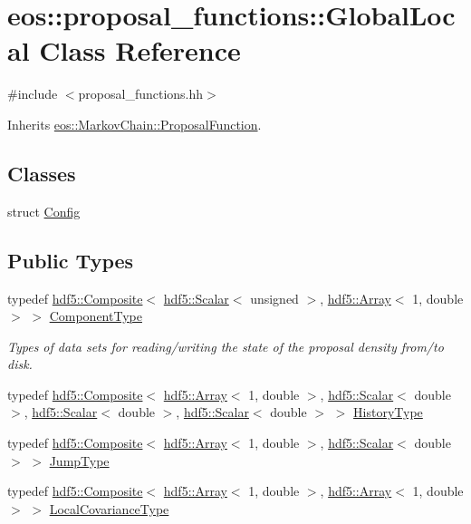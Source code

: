 \hypertarget{classeos_1_1proposal__functions_1_1GlobalLocal}{
\section{eos::proposal\_\-functions::GlobalLocal Class Reference}
\label{classeos_1_1proposal__functions_1_1GlobalLocal}
}


{\ttfamily \#include $<$proposal\_\-functions.hh$>$}

Inherits \hyperlink{structeos_1_1MarkovChain_1_1ProposalFunction}{eos::MarkovChain::ProposalFunction}.\subsection*{Classes}
\begin{DoxyCompactItemize}
\item 
struct \hyperlink{structeos_1_1proposal__functions_1_1GlobalLocal_1_1Config}{Config}
\end{DoxyCompactItemize}
\subsection*{Public Types}
\begin{DoxyCompactItemize}
\item 
typedef \hyperlink{classeos_1_1hdf5_1_1Composite}{hdf5::Composite}$<$ \hyperlink{classeos_1_1hdf5_1_1Scalar}{hdf5::Scalar}$<$ unsigned $>$, \hyperlink{classeos_1_1hdf5_1_1Array}{hdf5::Array}$<$ 1, double $>$ $>$ \hyperlink{classeos_1_1proposal__functions_1_1GlobalLocal_a8a0b2c1a71f2302bd4eeb95bc1d0041a}{ComponentType}
\begin{DoxyCompactList}\small\item\em Types of data sets for reading/writing the state of the proposal density from/to disk. \item\end{DoxyCompactList}\item 
typedef \hyperlink{classeos_1_1hdf5_1_1Composite}{hdf5::Composite}$<$ \hyperlink{classeos_1_1hdf5_1_1Array}{hdf5::Array}$<$ 1, double $>$, \hyperlink{classeos_1_1hdf5_1_1Scalar}{hdf5::Scalar}$<$ double $>$, \hyperlink{classeos_1_1hdf5_1_1Scalar}{hdf5::Scalar}$<$ double $>$, \hyperlink{classeos_1_1hdf5_1_1Scalar}{hdf5::Scalar}$<$ double $>$ $>$ \hyperlink{classeos_1_1proposal__functions_1_1GlobalLocal_ac6705377112dbaacb0141371b3c58b92}{HistoryType}
\item 
typedef \hyperlink{classeos_1_1hdf5_1_1Composite}{hdf5::Composite}$<$ \hyperlink{classeos_1_1hdf5_1_1Array}{hdf5::Array}$<$ 1, double $>$, \hyperlink{classeos_1_1hdf5_1_1Scalar}{hdf5::Scalar}$<$ double $>$ $>$ \hyperlink{classeos_1_1proposal__functions_1_1GlobalLocal_adaecb155ebcde100eb2f2f9bde76d3d3}{JumpType}
\item 
typedef \hyperlink{classeos_1_1hdf5_1_1Composite}{hdf5::Composite}$<$ \hyperlink{classeos_1_1hdf5_1_1Array}{hdf5::Array}$<$ 1, double $>$, \hyperlink{classeos_1_1hdf5_1_1Array}{hdf5::Array}$<$ 1, double $>$ $>$ \hyperlink{classeos_1_1proposal__functions_1_1GlobalLocal_a512e8526c29f20c96992efc8dcd2da2a}{LocalCovarianceType}
\end{DoxyCompactItemize}
